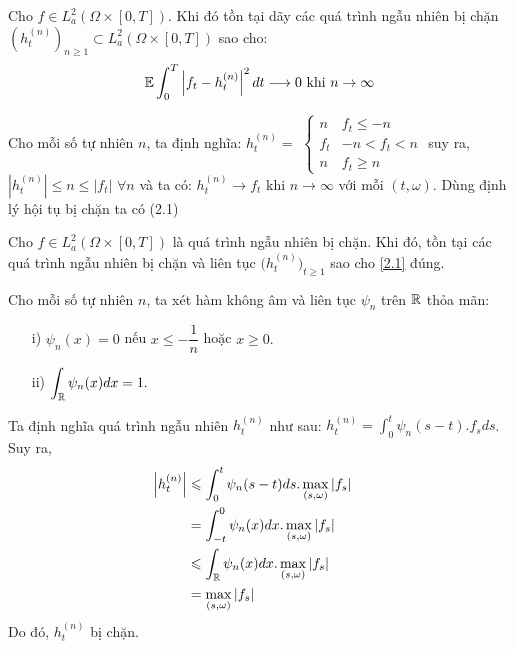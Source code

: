 \begin{lem}
    Cho $ f \in L_a^2(\Omega \times [0,T])$. Khi đó tồn tại dãy các quá trình ngẫu nhiên bị chặn $(h_t^{(n)})_{n \geq 1} \subset L_a^2(\Omega \times [0,T])$ sao cho: 
    \begin{equation}
         \mathbb{E} \displaystyle \int_0^T \left|f_t - h_t^{(n)} \right|^2 dt \longrightarrow 0 \text{ khi } n \to \infty \label{2.1}
    \end{equation}
\end{lem}
\begin{sol*}
    Cho mỗi số tự nhiên $n$, ta định nghĩa: $h_t^{(n)} =$
    $\left \{ \begin{matrix}
    n & f_t \leqslant -n \\
    f_t & -n < f_t < n  \\
    n & f_t\geqslant n
    \end{matrix}\right.$
    suy ra, $|h_t^{(n)}| \leqslant n \leqslant |f_t|$ $\forall n$ và ta có: $h_t^{(n)} \rightarrow f_t$ khi $n \rightarrow \infty$ với mỗi $(t, \omega)$. Dùng định lý hội tụ bị chặn ta có (2.1)
\end{sol*}
\begin{lem}
    Cho $f \in L_a^2(\Omega \times [0, T])$ là quá trình ngẫu nhiên bị chặn. Khi đó, tồn tại các quá trình ngẫu nhiên bị chặn và liên tục $\Big( h_t^{(n)}\Big)_{t\geqslant 1}$ sao cho \eqref{2.1} đúng.
\end{lem}
\begin{sol*}
    Cho mỗi số tự nhiên $n$, ta xét hàm không âm và liên tục $\psi_n$ trên $\mathbb{R}$ thỏa mãn:
    \begin{itemize}
        \item [i)] $\psi_n(x) = 0$ nếu $x \leqslant -\dfrac{1}{n}$ hoặc $x \geqslant 0.$
        \item [ii)] $\displaystyle \int_{\mathbb{R}} \psi_n(x)dx = 1.$
    \end{itemize}
    Ta định nghĩa quá trình ngẫu nhiên $h_t^{(n)}$ như sau: $h_t^{(n)} = \displaystyle \int _{0}^{t}\psi_n(s-t).f_sds$. Suy ra, 
    \begin{align*}
    \Big|h_t^{(n)}\Big| &\leqslant \displaystyle \int _{0}^{t}\psi_n(s - t)ds.\displaystyle\max_{(s, \omega)}|f_s|&\\
        &= \displaystyle \int _{-t}^{0}\psi_n(x)dx.\displaystyle\max_{(s,\omega)}|f_s|&\\
        &\leqslant \displaystyle \int_{\mathbb{R}}\psi_n(x)dx.\displaystyle\max_{(s, \omega)}|f_s|&\\
        &= \displaystyle\max_{(s, \omega)}|f_s| 
    \end{align*}
    Do đó, $h_t^{(n)}$ bị chặn.
\end{sol*}
